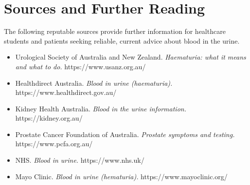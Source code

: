 \section*{Sources and Further Reading}
The following reputable sources provide further information for healthcare students and patients seeking reliable, current advice about blood in the urine.

\begin{itemize}
    \item Urological Society of Australia and New Zealand. \textit{Haematuria: what it means and what to do.} https://www.usanz.org.au/
    \item Healthdirect Australia. \textit{Blood in urine (haematuria).} https://www.healthdirect.gov.au/
    \item Kidney Health Australia. \textit{Blood in the urine information.} https://kidney.org.au/
    \item Prostate Cancer Foundation of Australia. \textit{Prostate symptoms and testing.} https://www.pcfa.org.au/
    \item NHS. \textit{Blood in urine.} https://www.nhs.uk/
    \item Mayo Clinic. \textit{Blood in urine (hematuria).} https://www.mayoclinic.org/
\end{itemize}
